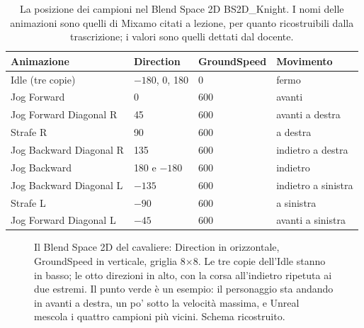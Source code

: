 \begin{table}[htbp]
\centering
\small
\begin{tabular}{@{}p{4.4cm}p{2.2cm}p{2.2cm}p{4.6cm}@{}}
\toprule
\textbf{Animazione} & \textbf{Direction} & \textbf{GroundSpeed} & \textbf{Movimento} \\
\midrule
Idle (tre copie) & $-180$, 0, 180 & 0 & fermo \\
Jog Forward & 0 & 600 & avanti \\
Jog Forward Diagonal R & 45 & 600 & avanti a destra \\
Strafe R & 90 & 600 & a destra \\
Jog Backward Diagonal R & 135 & 600 & indietro a destra \\
Jog Backward & 180 e $-180$ & 600 & indietro \\
Jog Backward Diagonal L & $-135$ & 600 & indietro a sinistra \\
Strafe L & $-90$ & 600 & a sinistra \\
Jog Forward Diagonal L & $-45$ & 600 & avanti a sinistra \\
\bottomrule
\end{tabular}
\caption{La posizione dei campioni nel Blend Space 2D BS2D\_Knight. I nomi delle
animazioni sono quelli di Mixamo citati a lezione, per quanto ricostruibili dalla
trascrizione; i valori sono quelli dettati dal docente.}
\label{ue9:tab:bs2d}
\end{table}

\begin{figure}[htbp]
\centering
{}
\caption{Il Blend Space 2D del cavaliere: Direction in orizzontale, GroundSpeed in
verticale, griglia 8$\times$8. Le tre copie dell'Idle stanno in basso; le otto direzioni
in alto, con la corsa all'indietro ripetuta ai due estremi. Il punto verde è un esempio:
il personaggio sta andando in avanti a destra, un po' sotto la velocità massima, e Unreal
mescola i quattro campioni più vicini. Schema ricostruito.}
\label{ue9:fig:blend2d}
\end{figure}

